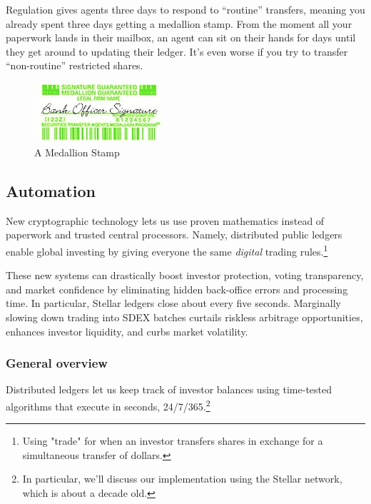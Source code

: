 \documentclass[11pt, english]{article}
\begin{document}
\begin{multicols}{2}
Regulation gives agents three days to respond to ``routine'' transfers, meaning you already spent three days getting a medallion stamp. From the moment all your paperwork lands in their mailbox, an agent can sit on their hands for days until they get around to updating their ledger. It's even worse if you try to transfer ``non-routine'' restricted shares. 

\begin{figure}[H]
    \centering
    \includegraphics[width=180]{imgs/medallion.jpg}
    \caption{A Medallion Stamp}
    \label{fig:decentralized}
\end{figure}


\subsection{Automation}

New cryptographic technology lets us use proven mathematics instead of paperwork and trusted central processors. Namely, distributed public ledgers enable global investing by giving everyone the same \textit{digital} trading rules.\footnote{Using "trade" for when an investor transfers shares in exchange for a simultaneous transfer of dollars.}

These new systems can drastically boost investor protection, voting transparency, and market confidence by eliminating hidden back-office errors and processing time. In particular, Stellar ledgers close about every five seconds. Marginally slowing down trading into SDEX batches curtails riskless arbitrage opportunities, enhances investor liquidity, and curbs market volatility. \cite{Veryzhenko_2017,Budish_2015,Chakrabarty_2015}

\subsubsection{General overview}

Distributed ledgers let us keep track of investor balances using time-tested algorithms that execute in seconds, 24/7/365.\footnote{In particular, we'll discuss our implementation using the Stellar network, which is about a decade old.}


\end{multicols}
\end{document}
